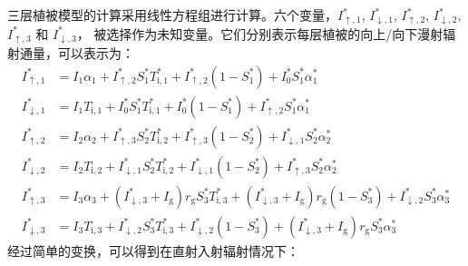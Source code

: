 三层植被模型的计算采用线性方程组进行计算。六个变量，$I_{\uparrow,1}^\ast$, $I_{\downarrow,1}^\ast$, $I_{\uparrow,2}^\ast$, $I_{\downarrow,2}^\ast$, $I_{\uparrow,3}^\ast$ 和 $I_{\downarrow,3}^\ast$，
被选择作为未知变量。它们分别表示每层植被的向上/向下漫射辐射通量，可以表示为：
\begin{equation}
  \begin{aligned}
    I_{\uparrow, 1}^{*} & =I_{1} \alpha_{1}+I_{\uparrow, 2}^{*} S_{1}^{*} T_{\mathrm{i, 1}}^{*}+I_{\uparrow, 2}^{*}\left(1-S_{1}^{*}\right)+I_{0}^{*} S_{1}^{*} \alpha_{1}^{*} \\[1ex]
    I_{\downarrow, 1}^{*} &=I_{1} T_{\mathrm{i, 1}}+I_{0}^{*} S_{1}^{*} T_{\mathrm{i, 1}}^{*}+I_{0}^{*}\left(1-S_{1}^{*}\right)+I_{\uparrow, 2}^{*} S_{1}^{*} \alpha_{1}^{*} \\[1ex]
    I_{\uparrow, 2}^{*} &=I_{2} \alpha_{2}+I_{\uparrow, 3}^{*} S_{2}^{*} T_{\mathrm{i, 2}}^{*}+I_{\uparrow, 3}^{*}\left(1-S_{2}^{*}\right)+I_{\downarrow, 1}^{*} S_{2}^{*} \alpha_{2}^{*} \\[1ex]
    I_{\downarrow, 2}^{*} &=I_{2} T_{\mathrm{i, 2}}+I_{\downarrow, 1}^{*} S_{2}^{*} T_{\mathrm{i, 2}}^{*}+I_{\downarrow, 1}^{*}\left(1-S_{2}^{*}\right)+I_{\uparrow, 3}^{*} S_{2}^{*} \alpha_{2}^{*} \\[1ex]
    I_{\uparrow, 3}^{*} &=I_{3} \alpha_{3}+\left(I_{\downarrow, 3}^{*}+I_{\mathrm{g}}\right) r_{\mathrm{g}} S_{3}^{*} T_{\mathrm{i, 3}}^{*}+\left(I_{\downarrow, 3}^{*}+I_{\mathrm{g}}\right) r_{\mathrm{g}}\left(1-S_{3}^{*}\right)+I_{\downarrow, 2}^{*} S_{3}^{*} \alpha_{3}^{*} \\[1ex]
    I_{\downarrow, 3}^{*} &=I_{3} T_{\mathrm{i, 3}}+I_{\downarrow, 2}^{*} S_{3}^{*} T_{\mathrm{i, 3}}^{*}+I_{\downarrow, 2}^{*}\left(1-S_{3}^{*}\right)+\left(I_{\downarrow, 3}^{*}+I_{\mathrm{g}}\right) r_{\mathrm{g}} S_{3}^{*} \alpha_{3}^{*}
  \end{aligned}
\end{equation}
经过简单的变换，可以得到在直射入射辐射情况下：
